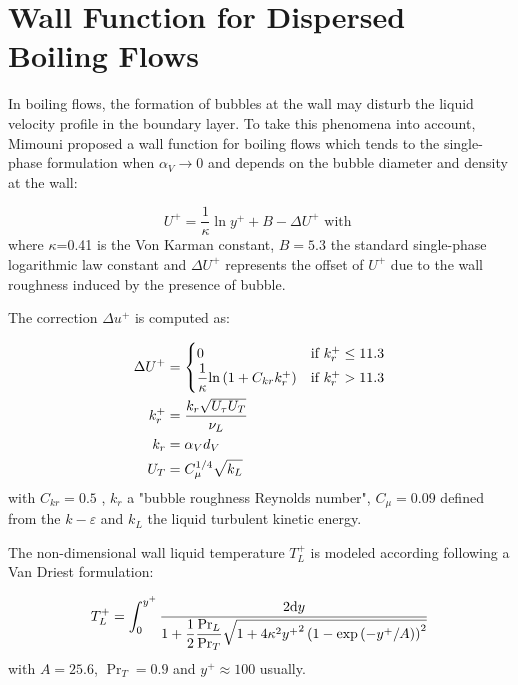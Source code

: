 \section{Wall Function for Dispersed Boiling Flows}
\label{subsec:wall_func}

In boiling flows, the formation of bubbles at the wall may disturb the liquid velocity profile in the boundary layer. To take this phenomena into account, Mimouni \etal\cite{mimouni_computational_2016} proposed a wall function for boiling flows which tends to the single-phase formulation when $\alpha_{V} \rightarrow 0$ and depends on the bubble diameter and density at the wall: 

\begin{equation}
U^{+}=\frac{1}{\kappa}\ln{ y^{+} } + B - \Delta U^{+} \text{ with } 
\label{eq:ncfd_wall_law}
\end{equation}
where $\kappa$=0.41 is the Von Karman constant, $B=5.3$ the standard single-phase logarithmic law constant and $\Delta U^{+}$ represents the offset of $U^{+}$ due to the wall roughness induced by the presence of bubble.

\npar

The correction $\Delta u^{+}$ is computed as:

\begin{align}
  \Delta U^{+}&=\begin{cases}
    0 & \text{if $k_{r}^{+}\leq 11.3$}\\
    \dfrac{1}{\kappa}\ln{ 1+ C_{kr}k_{r}^{+} } & \text{\text{if $k_{r}^{+}>11.3$}}
  \end{cases} \\
%
k_{r}^{+}&= \dfrac{k_{r}\sqrt{U_{\tau}U_{T}}}{\nu_{L}} \\
%
k_{r}&=\alpha_{V}d_{V}\\
%
U_{T}&=C_{\mu}^{1/4}\sqrt{k_{L}}
\end{align}
with $C_{kr}=0.5$ , $k_{r}$ a "bubble roughness Reynolds number", $C_{\mu}=0.09$ defined from the $k-\varepsilon$ and $k_{L}$ the liquid turbulent kinetic energy.

\npar

The non-dimensional wall liquid temperature $T_{L}^{+}$ is modeled according following a Van Driest formulation:

\begin{equation}
T_{L}^{+} = \int_{0}^{y^{+}} \frac{2\mathrm{d}y}{1 + \dfrac{1}{2}\dfrac{\mathrm{Pr}_{L}}{\mathrm{Pr}_{T}}\sqrt{1+4\kappa^{2} {y^{+}}^{2}  \left( 1-\mathrm{exp}\left( -y^{+}/A \right) \right)^{2}}}
\end{equation}
with $A=25.6$, $\Pr_{T} = 0.9$ and $y^{+} \approx 100$ usually.

